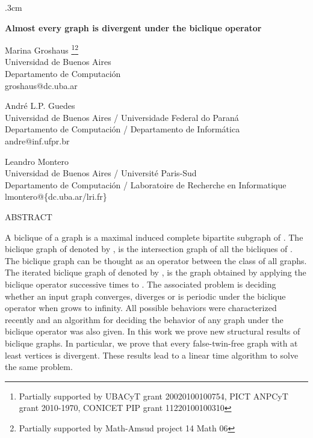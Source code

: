 \documentclass[12pt]{article}
\begin{document}
\parindent 0cm
\parskip .3cm
\thispagestyle{empty}
\begin{center}
\Large
 {\bf Almost every graph is divergent under the biclique operator}
\vfill

\large
Marina Groshaus \footnote{Partially
  supported by UBACyT grant  20020100100754, PICT ANPCyT grant 2010-1970,
  CONICET PIP grant 11220100100310}\footnote{Partially
  supported by Math-Amsud project 14 Math 06}\\
 \normalsize
Universidad de Buenos Aires \\
Departamento de Computaci\'on \\
groshaus@dc.uba.ar \\
\vfill

\large
Andr\'{e} L.P. Guedes\footnotemark[2]\\
 \normalsize
Universidad de Buenos Aires / Universidade Federal do Paran\'{a} \\
Departamento de Computaci\'on / Departamento de Inform\'{a}tica \\
andre@inf.ufpr.br \\
\vfill

\large
Leandro Montero \\
 \normalsize
Universidad de Buenos Aires / Universit\'e Paris-Sud \\
Departamento de Computaci\'on / Laboratoire de Recherche en Informatique \\
lmontero@\{dc.uba.ar/lri.fr\} \\



\normalsize 
\vspace{.5cm}

ABSTRACT
\end{center}

\small A biclique of a graph  is a maximal induced complete bipartite subgraph of . The biclique graph of  denoted by , is the intersection 
graph of all the bicliques of . The biclique graph can be thought as an operator between the class of all graphs. The iterated biclique graph of  
denoted by , is the graph obtained by applying the biclique operator  successive times to . 
The associated problem is deciding whether an input graph converges, diverges or is periodic under the biclique operator when  grows to infinity. 
All possible behaviors were characterized recently and an  algorithm for deciding the behavior of any graph under the biclique operator was also 
given. In this work we prove new structural results of biclique graphs. In particular, we prove that every false-twin-free graph with at least 
 vertices is divergent. These results lead to a linear time algorithm to solve the same problem.
\end{document}
